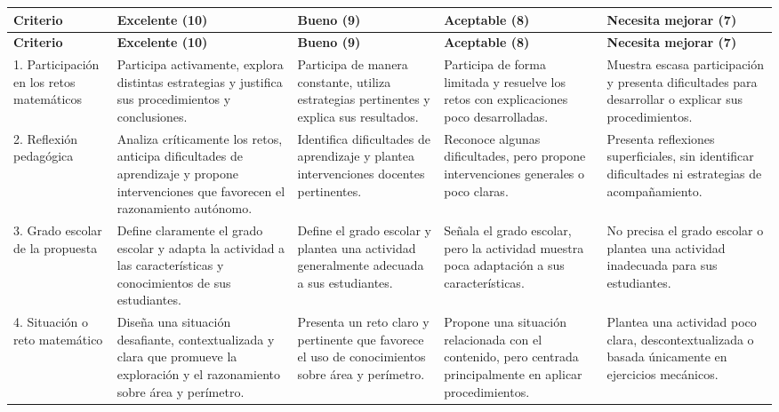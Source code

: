\documentclass[spanish,letterpaper,oneside]{article}
\begin{document}
\begin{rubricabox}

\begin{longtable}{|p{3cm}|p{2cm}|p{2cm}|p{2cm}|p{2cm}|}
\hline
\textbf{Criterio} & \textbf{Excelente (10)} & \textbf{Bueno (9)} & \textbf{Aceptable (8)} & \textbf{Necesita mejorar (7)} \\
\hline
\endfirsthead

\hline
\textbf{Criterio} & \textbf{Excelente (10)} & \textbf{Bueno (9)} & \textbf{Aceptable (8)} & \textbf{Necesita mejorar (7)} \\
\hline
\endhead

1. Participación en los retos matemáticos & Participa activamente, explora distintas estrategias y justifica sus procedimientos y conclusiones. & Participa de manera constante, utiliza estrategias pertinentes y explica sus resultados. & Participa de forma limitada y resuelve los retos con explicaciones poco desarrolladas. & Muestra escasa participación y presenta dificultades para desarrollar o explicar sus procedimientos. \\
\hline
2. Reflexión pedagógica & Analiza críticamente los retos, anticipa dificultades de aprendizaje y propone intervenciones que favorecen el razonamiento autónomo. & Identifica dificultades de aprendizaje y plantea intervenciones docentes pertinentes. & Reconoce algunas dificultades, pero propone intervenciones generales o poco claras. & Presenta reflexiones superficiales, sin identificar dificultades ni estrategias de acompañamiento. \\
\hline
3. Grado escolar de la propuesta & Define claramente el grado escolar y adapta la actividad a las características y conocimientos de sus estudiantes. & Define el grado escolar y plantea una actividad generalmente adecuada a sus estudiantes. & Señala el grado escolar, pero la actividad muestra poca adaptación a sus características. & No precisa el grado escolar o plantea una actividad inadecuada para sus estudiantes. \\
\hline
4. Situación o reto matemático & Diseña una situación desafiante, contextualizada y clara que promueve la exploración y el razonamiento sobre área y perímetro. & Presenta un reto claro y pertinente que favorece el uso de conocimientos sobre área y perímetro. & Propone una situación relacionada con el contenido, pero centrada principalmente en aplicar procedimientos. & Plantea una actividad poco clara, descontextualizada o basada únicamente en ejercicios mecánicos. \\

\end{longtable}
\end{rubricabox}
\end{document}
